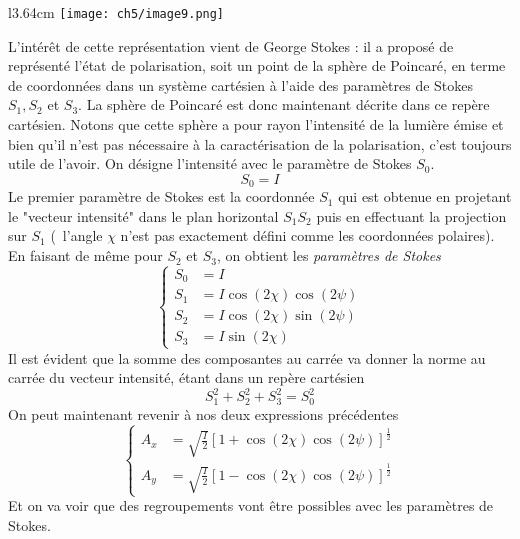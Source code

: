 	\begin{wrapfigure}[5]{l}{3.64cm}
	\vspace{-9mm}
	\texttt{[image: ch5/image9.png]}
	\end{wrapfigure}
	L'intérêt de cette représentation vient de George Stokes : il a proposé de représenté l'état 
	de polarisation, soit un point de la sphère de Poincaré, en terme de coordonnées dans un système 
	cartésien à l'aide des paramètres de Stokes $S_1, S_2$ et $S_3$. La sphère de Poincaré est donc 
	maintenant décrite dans ce repère cartésien. Notons que cette sphère a pour rayon l'intensité de 
	la lumière émise et bien qu'il n'est pas nécessaire à la caractérisation de la polarisation, 
	c'est toujours utile de l'avoir. On désigne l'intensité avec le paramètre de Stokes $S_0$.
 	\begin{equation}
 	S_0 = I
 	\end{equation}
 	Le premier paramètre de Stokes est la coordonnée $S_1$ qui est obtenue en projetant le "vecteur 
 	intensité" dans le plan horizontal $S_1S_2$ puis en effectuant la projection sur $S_1$ (\danger\ 
 	l'angle $\chi$ n'est pas exactement défini comme les coordonnées polaires). En faisant de même 
 	pour $S_2$ et $S_3$, on obtient les \textit{paramètres de Stokes}
 	\begin{equation}
	\left\{\begin{array}{ll}
	S_0 &= I\\
 	S_1 &= I\cos(2\chi)\cos(2\psi)\\
 	S_2 &= I\cos(2\chi)\sin(2\psi)\\
 	S_3 &= I\sin(2\chi)
	\end{array}\right.
 	\end{equation}
 	Il est évident que la somme des composantes au carrée va donner la norme au carrée du vecteur 
 	intensité, étant dans un repère cartésien
 	\begin{equation}
 	S^2_1+S^2_2+S^2_3 = S^2_0
 	\end{equation}
	On peut maintenant revenir à nos deux expressions précédentes
	\begin{equation}
	\left\{\begin{array}{ll}
	A_x &= \sqrt{\frac{I}{2}}[1+\cos(2\chi)\cos(2\psi)]^{\frac{1}{2}}\\
	A_y &= \sqrt{\frac{I}{2}}[1-\cos(2\chi)\cos(2\psi)]^{\frac{1}{2}}
	\end{array}\right.
	\end{equation}
	Et on va voir que des regroupements vont être possibles avec les paramètres de Stokes. 

